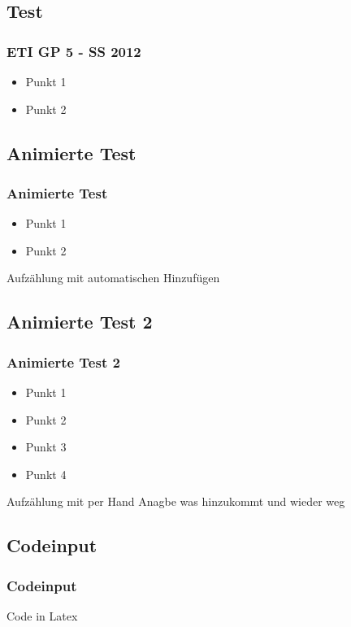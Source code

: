 \subsection{Test}
\begin{frame}
\frametitle{ETI GP 5 - SS 2012}
\begin{itemize}
\item Punkt 1
\item Punkt 2
\end{itemize}
\end{frame}

\subsection{Animierte Test}
\begin{frame}
\frametitle{Animierte Test}
\begin{itemize}[<+->]
\item Punkt 1
\item Punkt 2
\end{itemize}
Aufzählung mit automatischen Hinzufügen
\end{frame}

\subsection{Animierte Test 2}
\begin{frame}
\frametitle{Animierte Test 2}
\begin{itemize}
\item<1-> Punkt 1
\item<2-3> Punkt 2
\item<3-> Punkt 3
\item<4-> Punkt 4
\end{itemize}
Aufzählung mit per Hand Anagbe was hinzukommt und wieder weg
\end{frame}

\subsection{Codeinput}
\begin{frame}
\frametitle{Codeinput}

Code in Latex
\end{frame}